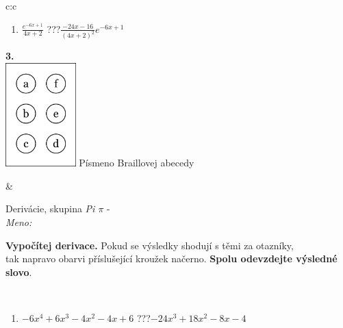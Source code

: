 \documentclass[10pt]{report}
\begin{document}
\begin{tabular}{c:c}
\begin{minipage}[c][104.5mm][t]{0.5\linewidth}
\begin{center}
\begin{minipage}{0.79\linewidth}
\begin{center}
\begin{varwidth}{\linewidth}
\begin{enumerate}
\item $\frac{e^{-6x+1}}{4x+2}$\quad \dotfill\; ???\;\dotfill \quad $\frac{-24x-16}{(4x+2)^2}e^{-6x+1}$
\end{enumerate}
\end{varwidth}
\end{center}
\end{minipage}
\begin{minipage}{0.20\linewidth}
\begin{center}
{\Huge\bfseries 3.} \\[2mm]
\includegraphics[height=40mm]{../images/braille.png}
{\small Písmeno Braillovej abecedy}
\end{center}
\end{minipage}
\end{center}
\end{minipage}
&
\begin{minipage}[c][104.5mm][t]{0.5\linewidth}
\begin{center}
\vspace{7mm}
{\huge Derivácie, skupina \textit{Pi $\pi$} -}\\[5mm]
\textit{Meno:}\phantom{xxxxxxxxxxxxxxxxxxxxxxxxxxxxxxxxxxxxxxxxxxxxxxxxxxxxxxxxxxxxxxxxx}\\[5mm]
\begin{minipage}{0.95\linewidth}
\begin{center}
\textbf{Vypočítej derivace.} Pokud se výsledky shodují s těmi za otazníky,\\tak napravo obarvi příslušející kroužek načerno. \textbf{Spolu odevzdejte výsledné slovo}.
\end{center}
\end{minipage}
\\[1mm]
\begin{minipage}{0.79\linewidth}
\begin{center}
\begin{varwidth}{\linewidth}
\begin{enumerate}
\normalsize
\item $-6x^4+6x^3-4x^2-4x+6$\quad \dotfill\; ???\;\dotfill \quad $-24x^3+18x^2-8x-4$

\end{enumerate}
\end{varwidth}
\end{center}
\end{minipage}
\end{center}
\end{minipage}
\end{tabular}
\end{document}
